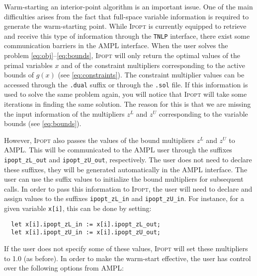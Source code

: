 \documentclass[10pt]{article}
\newcommand{\Ipopt}{\textsc{Ipopt}\xspace}
\begin{document}
Warm-starting an interior-point algorithm is an important issue. One of the main 
difficulties arises from the fact that full-space variable information is required to 
generate the warm-starting point. While \Ipopt is currently equipped to retrieve and receive 
this type of information through the {\tt TNLP} interface, there exist some communication 
barriers in the AMPL interface. When the user solves the problem 
\eqref{eq:obj}--\eqref{eq:bounds}, \Ipopt will only return the optimal values of the primal 
variables $x$ and of the constraint multipliers corresponding to the active bounds of $g(x)$ 
(see \eqref{eq:constraints}). The constraint multiplier values can be accessed through the 
{\tt .dual} suffix or through the {\tt .sol} file. If this information is used to solve the 
same problem again, you will notice that \Ipopt will take some iterations in finding the 
same solution. The reason for this is that we are missing the input information of the 
multipliers $z^L$ and $z^U$ corresponding to the variable bounds (see \eqref{eq:bounds}).

However, \Ipopt also passes the values of the bound multipliers $z^L$ and $z^U$ to AMPL. 
This will be communicated to the AMPL user through the suffixes {\tt ipopt\_zL\_out} and 
{\tt ipopt\_zU\_out}, respectively. The user does not need to declare these suffixes, they 
will be generated automatically in the AMPL interface. The user can use the suffix values to 
initialize the bound multipliers for subsequent calls. In order to pass this information to 
\Ipopt, the user will need to declare and assign values to the suffixes {\tt ipopt\_zL\_in} 
and {\tt ipopt\_zU\_in}. For instance, for a given variable {\tt x[i]}, this can be done by 
setting:
\begin{verbatim}
  let x[i].ipopt_zL_in := x[i].ipopt_zL_out;
  let x[i].ipopt_zU_in := x[i].ipopt_zU_out;
\end{verbatim}

If the user does not specify some of these values, \Ipopt will set these multipliers to 1.0 
(as before). In order to make the warm-start effective, the user has control over the 
following options from AMPL:\\
 \\
 \\
\end{document}
